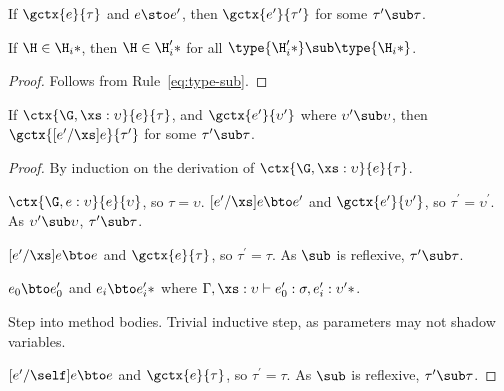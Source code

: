 \begin{theorem}[Preservation]
  \label{th:preservation}

  If $\gctx{e}{\tau}$ and $e \sto e^\prime$, then $\gctx{e^\prime}{\tau^\prime}$
  for some $\tau^\prime \sub \tau$.

  \begin{lemma}
    \label{lem:submethod}

    If $\H \in \*\H_i*$, then $\H \in \*\H^\prime_i*$ for all
    $\type{\*\H^\prime_i*} \sub \type{\*\H_i*}$.

    \begin{proof}
      Follows from Rule~\ref{eq:type-sub}.
    \end{proof}
  \end{lemma}

  \begin{lemma}
    \label{lem:preservation}

    If $\ctx{\G, \xs : \upsilon}{e}{\tau}$, and
    $\gctx{e^\prime}{\upsilon^\prime}$ where $\upsilon^\prime \sub \upsilon$,
    then $\gctx{[e^\prime/\xs]e}{\tau^\prime}$ for some $\tau^\prime \sub \tau$.

    \begin{proof}
      By induction on the derivation of $\ctx{\G, \xs : \upsilon}{e}{\tau}$.

      $\ctx{\G, e : \upsilon}{e}{\upsilon}$, so $\tau = \upsilon$.
      $[e^\prime/\xs]e \bto e^\prime$ and $\gctx{e^\prime}{\upsilon^\prime}$,
      so $\tau^\prime = \upsilon^\prime$.  As $\upsilon^\prime \sub \upsilon$,
      $\tau^\prime \sub \tau$.

      $[e^\prime/\xs]e \bto e$ and $\gctx{e}{\tau}$, so $\tau^\prime = \tau$.
      As $\sub$ is reflexive, $\tau^\prime \sub \tau$.

      $e_0 \bto e^\prime_0$ and $\*e_i \bto e^\prime_i*$ where $\Gamma, \xs :
      \upsilon \vdash e^\prime_0 : \sigma, \*e^\prime_i : \upsilon^\prime*$.

      Step into method bodies.  Trivial inductive step, as parameters may not
      shadow variables.

      $[e^\prime/\self]e \bto e$ and $\gctx{e}{\tau}$, so $\tau^\prime =
      \tau$. As $\sub$ is reflexive, $\tau^\prime \sub \tau$.
    \end{proof}
  \end{lemma}


\end{theorem}
